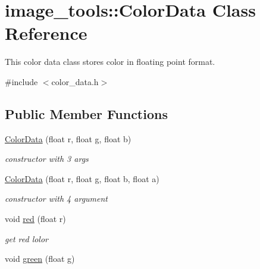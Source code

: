 \hypertarget{classimage__tools_1_1ColorData}{}\section{image\+\_\+tools\+:\+:Color\+Data Class Reference}
\label{classimage__tools_1_1ColorData}


This color data class stores color in floating point format.  




{\ttfamily \#include $<$color\+\_\+data.\+h$>$}

\subsection*{Public Member Functions}
\begin{DoxyCompactItemize}
\item 
\hyperlink{classimage__tools_1_1ColorData_ad64a66f681d0e502c2416e0bfcb86d14}{Color\+Data} (float r, float g, float b)\hypertarget{classimage__tools_1_1ColorData_ad64a66f681d0e502c2416e0bfcb86d14}{}\label{classimage__tools_1_1ColorData_ad64a66f681d0e502c2416e0bfcb86d14}

\begin{DoxyCompactList}\small\item\em constructor with 3 args \end{DoxyCompactList}\item 
\hyperlink{classimage__tools_1_1ColorData_a20782ba5f82e73e731b87311da1bcd56}{Color\+Data} (float r, float g, float b, float a)\hypertarget{classimage__tools_1_1ColorData_a20782ba5f82e73e731b87311da1bcd56}{}\label{classimage__tools_1_1ColorData_a20782ba5f82e73e731b87311da1bcd56}

\begin{DoxyCompactList}\small\item\em constructor with 4 argument \end{DoxyCompactList}\item 
void \hyperlink{classimage__tools_1_1ColorData_a36d30e0a43563d120ec3533b878a7558}{red} (float r)\hypertarget{classimage__tools_1_1ColorData_a36d30e0a43563d120ec3533b878a7558}{}\label{classimage__tools_1_1ColorData_a36d30e0a43563d120ec3533b878a7558}

\begin{DoxyCompactList}\small\item\em get red lolor \end{DoxyCompactList}\item 
void \hyperlink{classimage__tools_1_1ColorData_aaea99320f199dbdb36b87c82b8b5697d}{green} (float g)\hypertarget{classimage__tools_1_1ColorData_aaea99320f199dbdb36b87c82b8b5697d}{}\label{classimage__tools_1_1ColorData_aaea99320f199dbdb36b87c82b8b5697d}


\end{DoxyCompactItemize}
